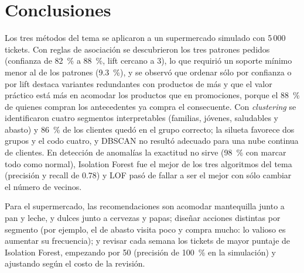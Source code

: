 \documentclass[11pt,letterpaper]{article}
\begin{document}
\section{Conclusiones}

Los tres métodos del tema se aplicaron a un supermercado simulado con 5\,000 tickets. Con reglas de asociación se descubrieron los tres patrones pedidos (confianza de 82~\% a 88~\%, lift cercano a 3), lo que requirió un soporte mínimo menor al de los patrones (9.3~\%), y se observó que ordenar sólo por confianza o por lift destaca variantes redundantes con productos de más y que el valor práctico está más en acomodar los productos que en promociones, porque el 88~\% de quienes compran los antecedentes ya compra el consecuente. Con \textit{clustering} se identificaron cuatro segmentos interpretables (familias, jóvenes, saludables y abasto) y 86~\% de los clientes quedó en el grupo correcto; la silueta favorece dos grupos y el codo cuatro, y DBSCAN no resultó adecuado para una nube continua de clientes. En detección de anomalías la exactitud no sirve (98~\% con marcar todo como normal), Isolation Forest fue el mejor de los tres algoritmos del tema (precisión y recall de 0.78) y LOF pasó de fallar a ser el mejor con sólo cambiar el número de vecinos.

Para el supermercado, las recomendaciones son acomodar mantequilla junto a pan y leche, y dulces junto a cervezas y papas; diseñar acciones distintas por segmento (por ejemplo, el de abasto visita poco y compra mucho: lo valioso es aumentar su frecuencia); y revisar cada semana los tickets de mayor puntaje de Isolation Forest, empezando por 50 (precisión de 100~\% en la simulación) y ajustando según el costo de la revisión.

\end{document}
